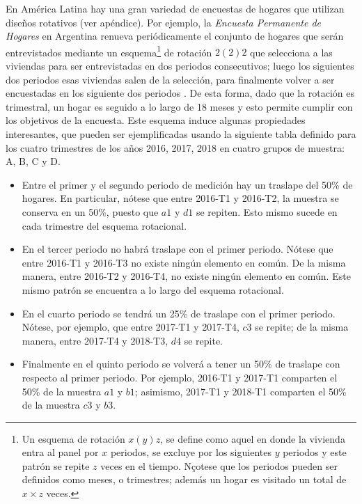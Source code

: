 \documentclass[
  12pt,
  spanish,
]{book}
\providecommand{\tightlist}{%
  \setlength{\itemsep}{0pt}\setlength{\parskip}{0pt}}
\begin{document}
En América Latina hay una gran variedad de encuestas de hogares que utilizan diseños rotativos (ver apéndice). Por ejemplo, la \emph{Encuesta Permanente de Hogares} en Argentina renueva periódicamente el conjunto de hogares que serán entrevistados mediante un esquema\footnote{Un esquema de rotación \(x(y)z\), se define como aquel en donde la vivienda entra al panel por \(x\) periodos, se excluye por los siguientes \(y\) periodos y este patrón se repite \(z\) veces en el tiempo. Nçotese que los periodos pueden ser definidos como meses, o trimestres; además un hogar es visitado un total de \(x \times z\) veces.} de rotación \(2(2)2\) que selecciona a las viviendas para ser entrevistadas en dos periodos consecutivos; luego los siguientes dos periodos esas viviendas salen de la selección, para finalmente volver a ser encuestadas en los siguiente dos periodos \citep{INDEC-AR}. De esta forma, dado que la rotación es trimestral, un hogar es seguido a lo largo de 18 meses y esto permite cumplir con los objetivos de la encuesta. Este esquema induce algunas propiedades interesantes, que pueden ser ejemplificadas usando la siguiente tabla definido para los cuatro trimestres de los años 2016, 2017, 2018 en cuatro grupos de muestra: A, B, C y D.

\begin{itemize}
\tightlist
\item
  Entre el primer y el segundo periodo de medición hay un traslape del 50\% de hogares. En particular, nótese que entre 2016-T1 y 2016-T2, la muestra se conserva en un 50\%, puesto que \(a1\) y \(d1\) se repiten. Esto mismo sucede en cada trimestre del esquema rotacional.
\item
  En el tercer periodo no habrá traslape con el primer periodo. Nótese que entre 2016-T1 y 2016-T3 no existe ningún elemento en común. De la misma manera, entre 2016-T2 y 2016-T4, no existe ningún elemento en común. Este mismo patrón se encuentra a lo largo del esquema rotacional.
\item
  En el cuarto periodo se tendrá un 25\% de traslape con el primer periodo. Nótese, por ejemplo, que entre 2017-T1 y 2017-T4, \(c3\) se repite; de la misma manera, entre 2017-T4 y 2018-T3, \(d4\) se repite.
\item
  Finalmente en el quinto periodo se volverá a tener un 50\% de traslape con respecto al primer periodo. Por ejemplo, 2016-T1 y 2017-T1 comparten el 50\% de la muestra \(a1\) y \(b1\); asimismo, 2017-T1 y 2018-T1 comparten el 50\% de la muestra \(c3\) y \(b3\).
\end{itemize}
\end{document}
